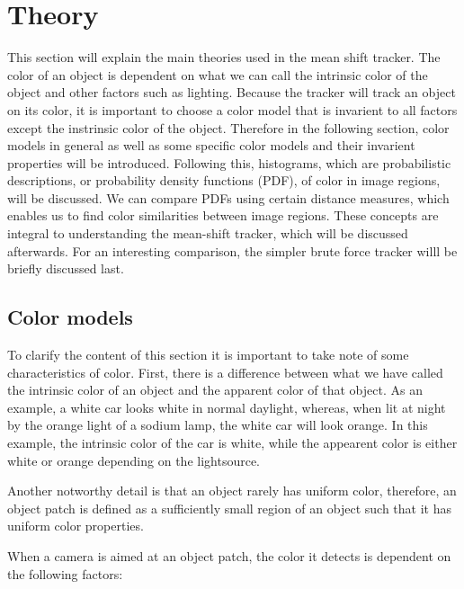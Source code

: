 \documentclass[a4paper,11pt]{article}
\begin{document}
\section{Theory}	

	This section will explain the main theories used in the mean shift tracker. The color of an object is dependent on what we can call the intrinsic color of the object and other factors such as lighting. Because the tracker will track an object on its color, it is important to choose a color model that is invarient to all factors except the instrinsic color of the object. Therefore in the following section, color models in general as well as some specific color models and their invarient properties will be introduced. Following this, histograms, which are probabilistic descriptions, or probability density functions (PDF), of color in image regions, will be discussed. We can compare PDFs using certain distance measures, which enables us to find color similarities between image regions. These concepts are integral to understanding the mean-shift tracker, which will be discussed afterwards. For an interesting comparison, the simpler brute force tracker willl be briefly discussed last.  



\subsection{Color models}

To clarify the content of this section it is important to take note of some characteristics of color. First, there is a difference between what we have called the intrinsic color of an object and the apparent color of that object. As an example, a white car looks white in normal daylight, whereas, when lit at night by the orange light of a sodium lamp, the white car will look orange. In this example, the intrinsic color of the car is white, while the appearent color is either white or orange depending on the lightsource.



Another notworthy detail is that an object rarely has uniform color, therefore, an object patch is defined as a sufficiently small region of an object such that it has uniform color properties. 



When a camera is aimed at an object patch, the color it detects is dependent on the following factors: 
\end{document}
